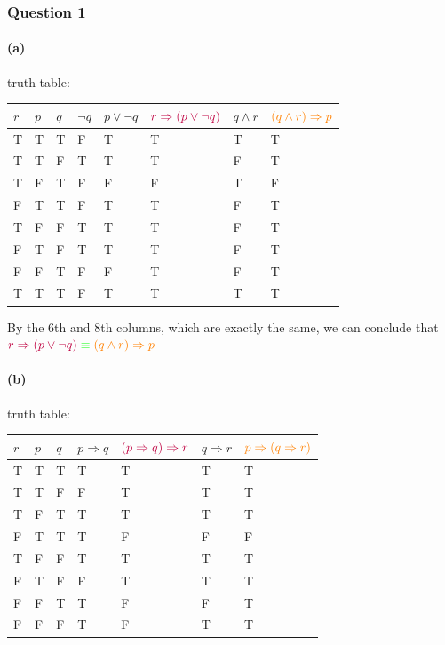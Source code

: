 \documentclass[
]{article}
\author{}
\date{}
\begin{document}
\hypertarget{question-1}{%
\subsubsection{Question 1}\label{question-1}}

\hypertarget{a}{%
\paragraph{(a)}\label{a}}

truth table:

\begin{longtable}[]{@{}llllllll@{}}
\toprule()
\(r\) & \(p\) & \(q\) & \(\neg q\) & \(p\vee \neg q\) &
\(\color{purple} r\Rightarrow (p\vee \neg q)\) & \(q\wedge r\) &
\(\color{orange}(q\wedge r)\Rightarrow p\) \\
\midrule()
\endhead
T & T & T & F & T & T & T & T \\
T & T & F & T & T & T & F & T \\
T & F & T & F & F & F & T & F \\
F & T & T & F & T & T & F & T \\
T & F & F & T & T & T & F & T \\
F & T & F & T & T & T & F & T \\
F & F & T & F & F & T & F & T \\
T & T & T & F & T & T & T & T \\
\bottomrule()
\end{longtable}

By the 6th and 8th columns, which are exactly the same, we can conclude
that
\(\color{purple} r\Rightarrow (p\vee \neg q)\color{green}\equiv \color{orange}(q\wedge r)\Rightarrow p\)

\hypertarget{b}{%
\paragraph{(b)}\label{b}}

truth table:

\begin{longtable}[]{@{}lllllll@{}}
\toprule()
\(r\) & \(p\) & \(q\) & \(p\Rightarrow q\) &
\(\color{purple}(p\Rightarrow q)\Rightarrow r\) & \(q\Rightarrow r\) &
\(\color{orange}p\Rightarrow(q\Rightarrow r)\) \\
\midrule()
\endhead
T & T & T & T & T & T & T \\
T & T & F & F & T & T & T \\
T & F & T & T & T & T & T \\
F & T & T & T & F & F & F \\
T & F & F & T & T & T & T \\
F & T & F & F & T & T & T \\
F & F & T & T & F & F & T \\
F & F & F & T & F & T & T \\
\bottomrule()
\end{longtable}
\end{document}
